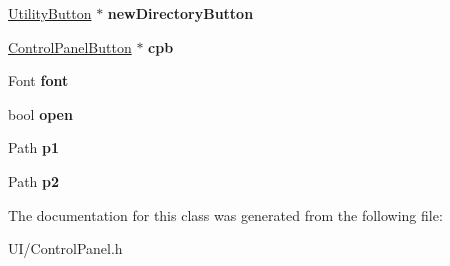 \begin{DoxyCompactItemize}
\item 
\hypertarget{classControlPanel_a0c941210737d30067a5c336f024c1157}{\hyperlink{classUtilityButton}{Utility\-Button} $\ast$ {\bfseries new\-Directory\-Button}}\label{classControlPanel_a0c941210737d30067a5c336f024c1157}

\item 
\hypertarget{classControlPanel_ab78156dbcac19b328ddb20d3c72e794b}{\hyperlink{classControlPanelButton}{Control\-Panel\-Button} $\ast$ {\bfseries cpb}}\label{classControlPanel_ab78156dbcac19b328ddb20d3c72e794b}

\item 
\hypertarget{classControlPanel_ae3e88f26d3d9b0a6e5be976beec7c443}{Font {\bfseries font}}\label{classControlPanel_ae3e88f26d3d9b0a6e5be976beec7c443}

\item 
\hypertarget{classControlPanel_a99a8244df64a86e35339bd7b54735cfa}{bool {\bfseries open}}\label{classControlPanel_a99a8244df64a86e35339bd7b54735cfa}

\item 
\hypertarget{classControlPanel_ab83143533f9630969a42b620ce5ca1db}{Path {\bfseries p1}}\label{classControlPanel_ab83143533f9630969a42b620ce5ca1db}

\item 
\hypertarget{classControlPanel_aea112d4e9c4bea8f44cbab90c1544ef2}{Path {\bfseries p2}}\label{classControlPanel_aea112d4e9c4bea8f44cbab90c1544ef2}

\end{DoxyCompactItemize}


The documentation for this class was generated from the following file\-:\begin{DoxyCompactItemize}
\item 
U\-I/Control\-Panel.\-h\end{DoxyCompactItemize}
